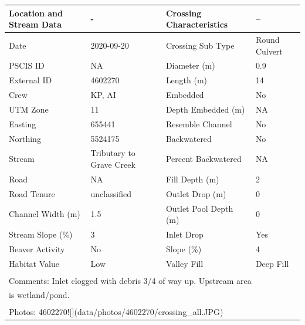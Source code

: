 \documentclass[
]{book}
\begin{document}
\begin{tabular}{l|l|l|l}
\hline
Location and Stream Data & - & Crossing Characteristics & --\\
\hline
Date & 2020-09-20 & Crossing Sub Type & Round Culvert\\
\hline
PSCIS ID & NA & Diameter (m) & 0.9\\
\hline
External ID & 4602270 & Length (m) & 14\\
\hline
Crew & KP, AI & Embedded & No\\
\hline
UTM Zone & 11 & Depth Embedded (m) & NA\\
\hline
Easting & 655441 & Resemble Channel & No\\
\hline
Northing & 5524175 & Backwatered & No\\
\hline
Stream & Tributary to Grave Creek & Percent Backwatered & NA\\
\hline
Road & NA & Fill Depth (m) & 2\\
\hline
Road Tenure & unclassified & Outlet Drop (m) & 0\\
\hline
Channel Width (m) & 1.5 & Outlet Pool Depth (m) & 0\\
\hline
Stream Slope (\%) & 3 & Inlet Drop & Yes\\
\hline
Beaver Activity & No & Slope (\%) & 4\\
\hline
Habitat Value & Low & Valley Fill & Deep Fill\\
\hline
\multicolumn{4}{l}{\textsuperscript{} Comments: Inlet clogged with debris 3/4 of way up. Upstream area}\\
\multicolumn{4}{l}{is wetland/pond.}\\
\multicolumn{4}{l}{\textsuperscript{} Photos: 4602270![](data/photos/4602270/crossing\_all.JPG)}\\
\end{tabular}
\end{document}
